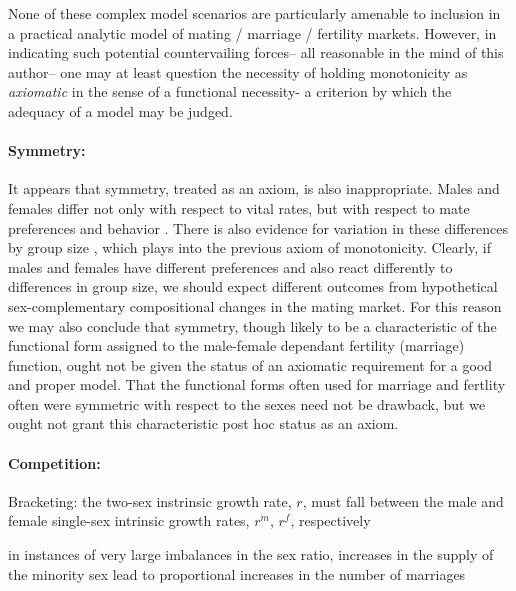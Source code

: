  None of these complex model scenarios are particularly amenable to inclusion in
 a practical analytic model of mating / marriage / fertility markets. However,
 in indicating such potential countervailing forces-- all reasonable in the mind
 of this author-- one may at least question the necessity of holding
 monotonicity as \textit{axiomatic} in the sense of a functional necessity- a
 criterion by which the adequacy of a model may be judged. 

\paragraph{Symmetry:} It appears that symmetry, treated as an axiom, is also
inappropriate. Males and females differ not only with respect to vital rates,
but with respect to mate preferences and behavior \citep{buss1989sex}. There is
also evidence for variation in these differences by group size
\citep{fisman2006gender}, which plays into the previous axiom of monotonicity.
Clearly, if males and females have different preferences and also react
differently to differences in group size, we should expect different outcomes
from hypothetical sex-complementary compositional changes in the mating market.
For this reason we may also conclude that symmetry, though likely to be a
characteristic of the functional form assigned to the male-female
dependant fertility (marriage) function, ought not be given the status of an
axiomatic requirement for a good and proper model. That the functional forms
often used for marriage and fertlity often were symmetric with respect to the
sexes need not be drawback, but we ought not grant this characteristic post hoc
status as an axiom.

\paragraph{Competition:}
Bracketing: the two-sex instrinsic growth rate, $r$, must fall between the male
and female single-sex intrinsic growth rates, $r^m$, $r^f$, respectively

in instances of very large imbalances in the sex ratio, increases in the supply
of the minority sex lead to proportional increases in the number of marriages


